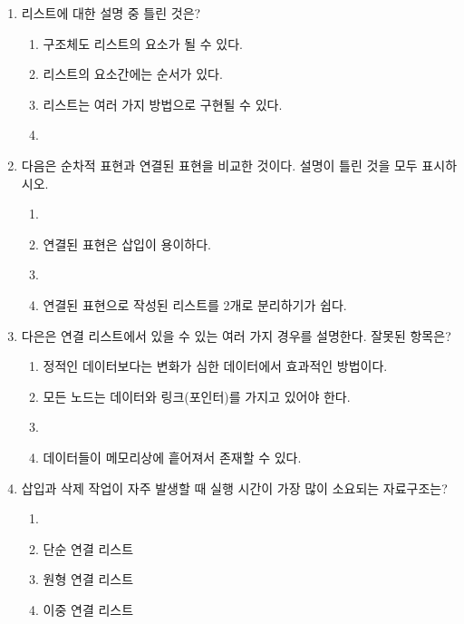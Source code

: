\documentclass[11pt,a4paper]{article}
\begin{document}
\noindent
\begin{enumerate}
	

\item 리스트에 대한 설명 중 틀린 것은?
\begin{enumerate}
	\item 구조체도 리스트의 요소가 될 수 있다.
	\item 리스트의 요소간에는 순서가 있다.
	\item 리스트는 여러 가지 방법으로 구현될 수 있다.
	\item {}
\end{enumerate}

\item 다음은 순차적 표현과 연결된 표현을 비교한 것이다. 설명이 틀린 것을 모두 표시하시오.
	\begin{enumerate}
	\item {}
	\item 연결된 표현은 삽입이 용이하다.
	\item {}
	\item 연결된 표현으로 작성된 리스트를 2개로 분리하기가 쉽다.
	\end{enumerate}
	
\item 다은은 연결 리스트에서 있을 수 있는 여러 가지 경우를 설명한다. 잘못된 항목은?
	\begin{enumerate}
		\item 정적인 데이터보다는 변화가 심한 데이터에서 효과적인 방법이다.
		\item 모든 노드는 데이터와 링크(포인터)를 가지고 있어야 한다.
		\item {}
		\item 데이터들이 메모리상에 흩어져서 존재할 수 있다.
	\end{enumerate}

\item 삽입과 삭제 작업이 자주 발생할 때 실행 시간이 가장 많이 소요되는 자료구조는?
	\begin{enumerate}
		\item {}
		\item 단순 연결 리스트
		\item 원형 연결 리스트
		\item 이중 연결 리스트
	\end{enumerate}


\end{enumerate}
\end{document}
